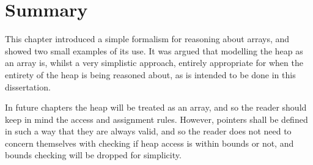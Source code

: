\section{Summary}
\label{sec:heap-summary}

This chapter introduced a simple formalism for reasoning about arrays,
and showed two small examples of its use. It was argued that modelling
the heap as an array is, whilst a very simplistic approach, entirely
appropriate for when the entirety of the heap is being reasoned about,
as is intended to be done in this dissertation.

In future chapters the heap will be treated as an array, and so the
reader should keep in mind the access and assignment rules. However,
pointers shall be defined in such a way that they are always valid,
and so the reader does not need to concern themselves with checking if
heap access is within bounds or not, and bounds checking will be
dropped for simplicity.
